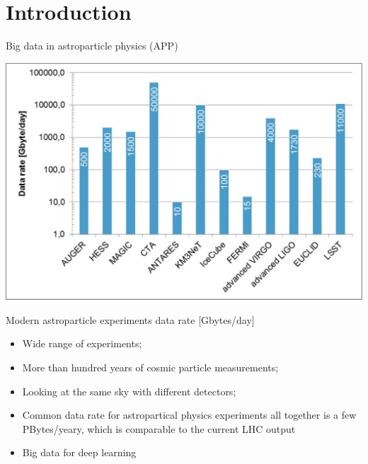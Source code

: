 
\begin{frame}
\titlepage
\end{frame}

\section{Introduction}

\begin{frame}{Big data in astroparticle physics (APP)}
    \small
    \begin{minipage}[c]{0.58\textwidth}
        \begin{center}
            \includegraphics[width=1\textwidth]{pics/appec_computing-diagram.pdf}
        \end{center}
        \vspace{-2\parsep}
        \small Modern astroparticle experiments data rate [Gbytes/day]\footnotemark[1] %
    \end{minipage}
    \hfill
    \begin{minipage}[c]{0.41\textwidth}
        \begin{itemize}
            \setlength{\itemsep}{0pt}
            \item Wide range of experiments;
            \item More than hundred years of cosmic particle measurements;
            \item Looking at the same sky with different detectors;
            \item Common data rate for astropartical physics experiments all together is a few PBytes/yeary, which is comparable to the current LHC output\footnotemark[1]
            \item Big data for deep learning
        \end{itemize}
    \end{minipage}
    \footnotesize{}
\end{frame}

